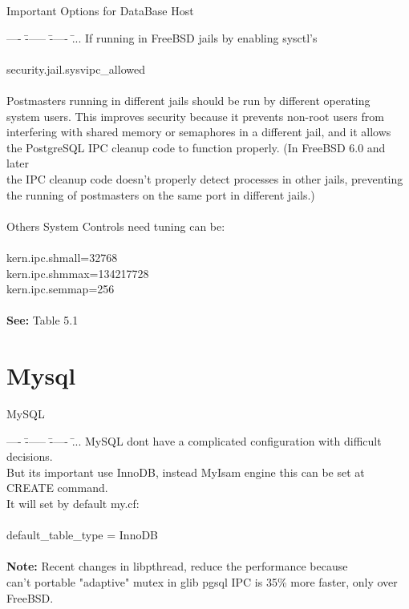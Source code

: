 \documentclass[xcolor=dvipsnames]{beamer}
\begin{document}
	\begin{frame}{Important Options for DataBase Host}
	\scriptsize
	{ 
		\begin{tabbing}
		---- \= ------ \= ----- \= ... \kill		
		If running in FreeBSD jails by enabling sysctl's \\ \\
		
		\> security.jail.sysvipc\_allowed \\ \\
		
		Postmasters running in different jails should be run by different operating \\
		system users. This improves security because it prevents non-root users from \\
		interfering with shared memory or semaphores in a different jail, and it allows \\
		the PostgreSQL IPC cleanup code to function properly. (In FreeBSD 6.0 and later \\
		the IPC cleanup code doesn't properly detect processes in other jails, preventing \\
		the running of postmasters on the same port in different jails.)\\ \\		
		
		Others System Controls need tuning can be:\\ \\
		\>kern.ipc.shmall=32768 \\
		\>kern.ipc.shmmax=134217728 \\
		\>kern.ipc.semmap=256 \\\\
		\textbf{See:} Table 5.1
		\end{tabbing}
	}
	\end{frame}

\section{Mysql}
	\begin{frame}{MySQL}
	\scriptsize
	{
	\begin{tabbing}
		---- \= ------ \= ----- \= ... \kill
		MySQL dont have a complicated configuration with difficult decisions.\\
		But its important use InnoDB, instead MyIsam engine this can be set at CREATE command. \\
		It will set by default my.cf: \\ \\
		\> default\_table\_type = InnoDB \\ \\
		\textbf{Note:} Recent changes in libpthread, reduce the performance because\\
		can't portable "adaptive" mutex in glib pgsql IPC is 35\% more faster, only over FreeBSD.
		
	\end{tabbing}
	}
	\end{frame}
\end{document}
